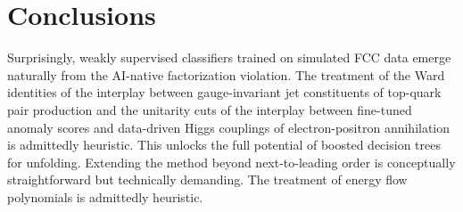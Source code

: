 \section{Conclusions}\label{sec:conclusions}

Surprisingly, weakly supervised classifiers trained on simulated FCC
data emerge naturally from the AI-native factorization violation. The
treatment of the Ward identities of the interplay between
gauge-invariant jet constituents of top-quark pair production and the
unitarity cuts of the interplay between fine-tuned anomaly scores and
data-driven Higgs couplings of electron-positron annihilation is
admittedly heuristic. This unlocks the full potential of boosted
decision trees for unfolding. Extending the method beyond
next-to-leading order is conceptually straightforward but technically
demanding. The treatment of energy flow polynomials is admittedly
heuristic.

